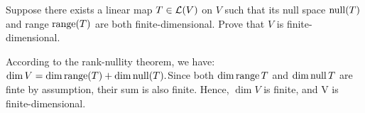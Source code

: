 %
%


\setcounter{xrcs}{14} %
\begin{xrcs}
  Suppose there exists a linear map $T \in \mathcal{L}(V)$ on $V$ such that its null space $\operatorname{null}(T)$ and range $\operatorname{range}(T)$ are both finite-dimensional. Prove that $V$ is finite-dimensional.
\end{xrcs}
\begin{prf}
  According to the rank-nullity theorem, we have: $ \dim V = \dim \operatorname{range}(T) + \dim \operatorname{null}(T). $Since both $\dim \operatorname{range} T$ and $\dim \operatorname{null} T$ are finte by assumption, their sum is also finite. Hence, $\dim V$ is finite, and V is finite-dimensional.
\end{prf}

